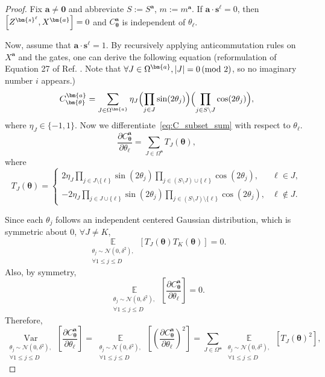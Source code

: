 \documentclass[a4paper,onecolumn,notitlepage,nofootinbib,longbibliography,superscriptaddress, floatfix, pra, aps, 10pt]{revtex4-2}
\newcommand{\vttheta}{{\bm{\theta}}}
\newcommand{\vta}{{\bm{a}}}
\newcommand{\vtsl}{{\bm{s}^\ell}}
\newcommand{\vts}{{\bm{s}}}
\begin{document}
\begin{proof}
Fix $\vta\neq \mathbf 0$ and abbreviate $S:=S^\vta$, $m:=m^\vta$.
If $\vta \cdot \vtsl=0$, then $\comm{Z^{\vts^\ell}}{X^\vta}=0$ and $C^\vta_\vttheta$ is independent of $\theta_\ell$. 

Now, assume that $\vta \cdot \vtsl=1$. By recursively applying anticommutation rules on $X^\vta$ and the gates, one can derive the following equation (reformulation of Equation 27 of Ref. \cite{recio2025train}. Note that $\forall J \in \Omega^\vta, \abs{J} = 0 \, (\text{mod 2})$, so no imaginary number $i$ appears.)
\begin{equation}
C^\vta_\vttheta
=
\sum_{J\in\Omega^\vta} \eta_J 
\Bigl(\prod_{j\in J} \sin(2\theta_j)\Bigr)\Bigl(\prod_{j\in S\setminus J}\cos(2\theta_j)\Bigr),
\label{eq:C_subset_sum}
\end{equation}
where $\eta_J \in \{-1,1\}$.
Now we differentiate~\eqref{eq:C_subset_sum} with respect to $\theta_\ell$.
\begin{equation}
\frac{\partial C^\vta_\vttheta}{\partial\theta_\ell}
=
\sum_{J\in\Omega^\vta} T_J(\vttheta),
\end{equation}
where
\begin{equation}
T_J(\vttheta)
=
\begin{cases}
2 \eta_J\prod_{j\in J\setminus\{\ell\}}\sin(2\theta_j)\prod_{j\in (S\setminus J) \cup \{\ell\}}\cos(2\theta_j), & \ell\in J,\\
-2 \eta_J \prod_{j\in J\cup \{\ell \}}\sin(2\theta_j)\prod_{j\in (S\setminus J)\setminus\{\ell\}}\cos(2\theta_j), & \ell\notin J.
\end{cases}
\label{eq:TJ_def}
\end{equation}

Since each $\theta_j$ follows an independent centered Gaussian distribution, which is symmetric about $0$, $\forall J \neq K$,  
\begin{equation}
\operatorname*{\mathbb{E}}_{\substack{\theta_j \sim \mathcal{N}(0, \delta^2),\\ \forall 1 \leq j \leq D}}[T_J(\vttheta)T_K(\vttheta)] = 0.
\label{eq:cross_terms_vanish}
\end{equation}
Also, by symmetry, \begin{equation}
    \operatorname*{\mathbb{E}}_{\substack{\theta_j \sim \mathcal{N}(0, \delta^2),\\ \forall 1 \leq j \leq D}} \left[ \frac{\partial C^\vta_\vttheta}{\partial\theta_\ell}\right] = 0.
\end{equation}
Therefore,
\begin{equation}
\operatorname*{Var}_{\substack{\theta_j \sim \mathcal{N}(0, \delta^2),\\ \forall 1 \leq j \leq D}}\left[\frac{\partial C^\vta_\vttheta}{\partial\theta_\ell}\right]
=
\operatorname*{\mathbb{E}}_{\substack{\theta_j \sim \mathcal{N}(0, \delta^2),\\ \forall 1 \leq j \leq D}}\left[\left(\frac{\partial C^\vta_\vttheta}{\partial\theta_\ell}\right)^2\right]
=
\sum_{J\in\Omega^\vta}\operatorname*{\mathbb{E}}_{\substack{\theta_j \sim \mathcal{N}(0, \delta^2),\\ \forall 1 \leq j \leq D}}[T_J(\vttheta)^2],
\end{equation}


\end{proof}
\end{document}
